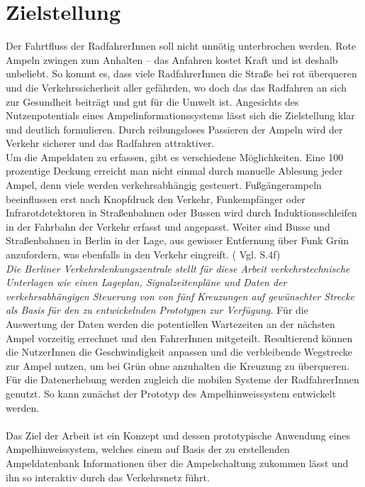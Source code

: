 \section{Zielstellung}
Der Fahrtfluss der RadfahrerInnen soll nicht unnötig unterbrochen werden. Rote Ampeln zwingen zum Anhalten -- das Anfahren kostet Kraft und ist deshalb unbeliebt. So kommt es, dass viele RadfahrerInnen die Straße bei rot überqueren und die Verkehrssicherheit aller gefährden, wo doch das das Radfahren an sich zur Gesundheit beiträgt und gut für die Umwelt ist. Angesichts des Nutzenpotentials eines Ampelinformationssystems lässt sich die Zielstellung klar und deutlich formulieren. Durch reibungsloses Passieren der Ampeln wird der Verkehr sicherer und das Radfahren attraktiver.\\
Um die Ampeldaten zu erfassen, gibt es verschiedene Möglichkeiten. Eine 100 prozentige Deckung erreicht man nicht einmal durch manuelle Ablesung jeder Ampel, denn viele  werden verkehrsabhängig gesteuert. Fußgängerampeln beeinflussen erst nach Knopfdruck den Verkehr, Funkempfänger oder Infrarotdetektoren in Straßenbahnen oder Bussen wird durch Induktionsschleifen in der Fahrbahn der Verkehr erfasst und angepasst. Weiter sind Busse und Straßenbahnen in Berlin in der Lage, aus gewisser Entfernung über Funk Grün anzufordern, was ebenfalls in den Verkehr eingreift. ( Vgl. \cite{lsa_bln} S.4f) \\
\textit{Die Berliner Verkehrslenkungszentrale stellt für diese Arbeit verkehrstechnische Unterlagen wie einen Lageplan, Signalzeitenpläne und Daten der verkehrsabhängigen Steuerung von  von fünf Kreuzungen auf gewünschter Strecke als Basis für den zu entwickelnden Prototypen zur Verfügung.} 
Für die Auswertung der Daten werden die potentiellen Wartezeiten an der nächsten Ampel vorzeitig errechnet und den FahrerInnen mitgeteilt. Resultierend können die NutzerInnen die Geschwindigkeit anpassen und die verbleibende Wegstrecke zur Ampel nutzen, um bei Grün ohne anzuhalten die Kreuzung zu überqueren. Für die Datenerhebung werden zugleich die mobilen Systeme der RadfahrerInnen genutzt. So kann zunächst der Prototyp des Ampelhinweissystem entwickelt werden.\\\\
Das Ziel der Arbeit ist ein Konzept und dessen prototypische Anwendung eines Ampelhinweissystem, welches einem auf Basis der zu erstellenden  Ampeldatenbank Informationen über die Ampelschaltung zukommen lässt und ihn so interaktiv durch das Verkehrsnetz führt.
%
%
